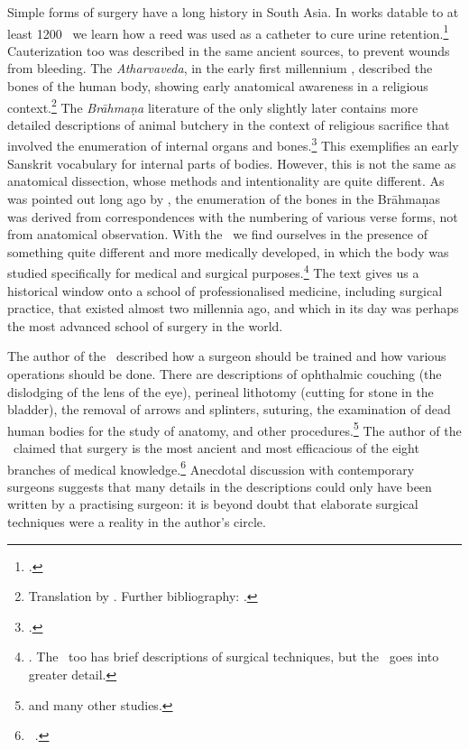 Simple forms of surgery have a long history in South Asia. In works datable to at
least 1200 \BC\ we learn how a reed was used as a catheter to cure urine
retention.\footcite[70--71]{zysk-1985} Cauterization too was described in the same
ancient sources, to prevent wounds from bleeding. The \emph{Atharvaveda}, in the
early first millennium \BC, described the bones of the human body, showing early
anatomical awareness in a religious context.\footnote{Translation by \citet[\S43,
\S100]{hoer-1907}. Further bibliography: \cite[IIB, 819]{meul-hist}.} The
\emph{Brāhmaṇa} literature of the only slightly later contains more detailed
descriptions of animal butchery in the context of religious sacrifice that
involved the enumeration of internal organs and
bones.\footcite{mala-1996,saha-2015}   This exemplifies an early Sanskrit
vocabulary for internal parts of bodies.  However, this is not the same as
anatomical dissection, whose methods and intentionality are quite different. As
was pointed out long ago by \citet{keit-1908}, the enumeration of the bones in the
Brāhmaṇas was derived from correspondences with the numbering of various verse
forms, not from anatomical observation.  With the \SS\ we find ourselves in the
presence of something quite different and more medically developed, in which the
body was studied specifically for medical and surgical
purposes.\footnote{\cite{zysk-1986}. The \CS\ too has brief descriptions of
surgical techniques, but the \SS\ goes into greater detail.} The text gives us a
historical window onto a school of professionalised medicine, including surgical
practice, that existed almost two millennia ago, and which in its day was perhaps
the most advanced school of surgery in the world.

The author of the \SS\ described how a surgeon should be trained and how various
operations should be done.  There are descriptions of ophthalmic couching (the
dislodging of the lens of the eye), perineal lithotomy (cutting for stone in the
bladder), the removal of arrows and splinters, suturing, the examination of dead
human bodies for the study of anatomy, and other
procedures.\footnote{\cites{mukh-1913,desh-2000,nara-2011,wuja-2003,wils-1823,vali-2007}
 and
many other studies.} The author of the \SS\ claimed that surgery is the most
ancient and most efficacious of the eight branches of medical
knowledge.\footnote{\SS\ .} Anecdotal discussion with
contemporary surgeons suggests that many details in the descriptions could only
have been written by a practising surgeon: it is beyond doubt that elaborate
surgical techniques were a reality in the author's circle. %

